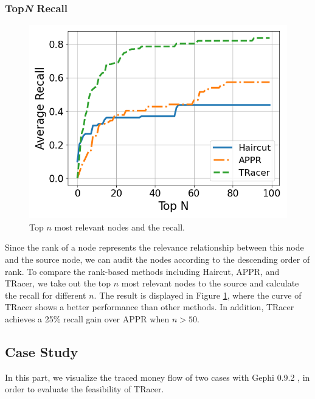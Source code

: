 \subsubsection{Top\textit{N} Recall}
\begin{figure}[t]
    \centering
    \includegraphics[width=0.6\linewidth]{figures/topn_recall_v2.png}
    \caption{Top $n$ most relevant nodes and the recall. 
    }
    \label{fig:topn_recall}
\end{figure}

Since the rank of a node represents the relevance relationship between this node and the source node, we can audit the nodes according to the descending order of rank. To compare the rank-based methods including Haircut, APPR, and TRacer, we take out the top $n$ most relevant nodes to the source and calculate the recall for different $n$.
The result is displayed in Figure \ref{fig:topn_recall}, where the curve of TRacer shows a better performance than other methods.
In addition, TRacer achieves a 25\% recall gain over APPR when $n>50$.

\subsection{Case Study}
\label{sec:case_study}
In this part, we visualize the traced money flow of two cases with Gephi 0.9.2 \cite{bastian2009gephi}, in order to evaluate the feasibility of TRacer.

